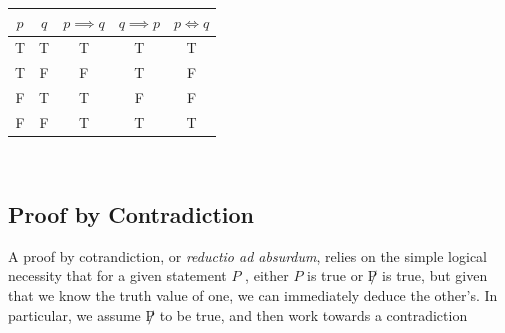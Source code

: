 \documentclass[english,course]{Notes}
\newcommand{\ita}[1]{\textit{#1}}
\begin{document}
\begin{minipage}[c]{.5\textwidth}
	\begin{tabular}{|c|c|c|c|c|}
		$p$ & $q$ & $p \implies q$ & $q \implies p$ & $p \iff q$ \\
		\hline
		T & T & T & T & T\\
		T & F & F & T & F\\
		F & T & T & F & F\\
		F & F & T & T & T
	\end{tabular}
\end{minipage}
~\\


\subsection{Proof by Contradiction}

\par{A proof by cotrandiction, or \ita{reductio ad absurdum}, relies on the simple logical necessity that for a given statement $P$ , either $P$ is true or $\not P$ is true, but given that we know the truth value of one, we can immediately deduce the other's. In particular, we assume $\not P$ to be true, and then work towards a contradiction}
\end{document}
